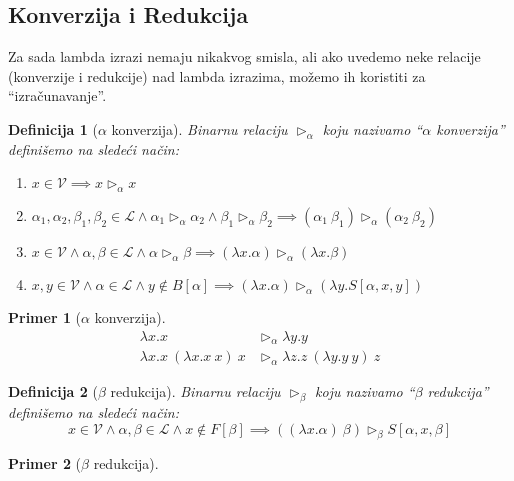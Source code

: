 \documentclass[10pt,a4paper,oneside]{article}
\newtheorem*{definition}{Definicija}
\newtheorem*{primer}{Primer}
\begin{document}
  \subsection{Konverzija i Redukcija}
    Za sada lambda izrazi nemaju nikakvog smisla, ali ako uvedemo neke relacije (konverzije i redukcije) nad lambda izrazima, mo\v{z}emo ih koristiti za ``izra\v{c}unavanje''.

    \begin{definition}[\(\alpha\) konverzija]
      Binarnu relaciju \(\vartriangleright_{\alpha}\) koju nazivamo ``\(\alpha\) konverzija'' defini\v{s}emo na slede\'{c}i na\v{c}in:
      \begin{enumerate}
        \item
          \(
            x \in \mathcal{V} \implies
            x \vartriangleright_{\alpha} x
          \)
        \item
          \(
            \alpha_{1}, \alpha_{2}, \beta_{1}, \beta_{2} \in \mathcal{L} \land
            \alpha_{1} \vartriangleright_{\alpha} \alpha_{2} \land
            \beta_{1} \vartriangleright_{\alpha} \beta_{2} \implies
            (\alpha_{1}\ \beta_{1}) \vartriangleright_{\alpha} (\alpha_{2}\ \beta_{2})
          \)
        \item
          \(
            x \in \mathcal{V} \land
            \alpha, \beta \in \mathcal{L} \land
            \alpha \vartriangleright_{\alpha} \beta \implies
            (\lambda x.\alpha) \vartriangleright_{\alpha} (\lambda x.\beta)
          \)
        \item
          \(
            x, y \in \mathcal{V} \land
            \alpha \in \mathcal{L} \land
            y \notin B[\alpha] \implies
            (\lambda x.\alpha) \vartriangleright_{\alpha} (\lambda y.S[\alpha, x, y])
          \)
      \end{enumerate}
    \end{definition}
    \begin{primer}[\(\alpha\) konverzija]
      \begin{align*}
        \lambda x.x &\vartriangleright_{\alpha} \lambda y.y\\
        \lambda x.x\ (\lambda x.x\ x)\ x &\vartriangleright_{\alpha} \lambda z.z\ (\lambda y.y\ y)\ z
      \end{align*}
    \end{primer}

    \begin{definition}[\(\beta\) redukcija]
      Binarnu relaciju \(\vartriangleright_{\beta}\) koju nazivamo ``\(\beta\) redukcija'' defini\v{s}emo na slede\'{c}i na\v{c}in:
      \[
        x \in \mathcal{V} \land
        \alpha, \beta \in \mathcal{L} \land
        x \notin F[\beta] \implies
        ((\lambda x.\alpha)\ \beta) \vartriangleright_{\beta} S[\alpha, x, \beta]
      \]
    \end{definition}
    \begin{primer}[\(\beta\) redukcija]
      \begin{align*}
      \end{align*}
    \end{primer}
\end{document}
